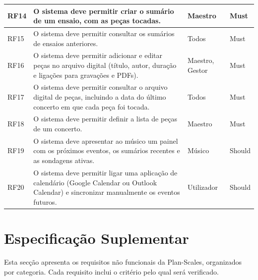 \begin{longtable}{|p{1.4cm}|p{8.6cm}|p{2.4cm}|p{1.6cm}|}
RF14 & O sistema deve permitir criar o sumário de um ensaio, com as peças tocadas. & Maestro & Must \\ \hline
RF15 & O sistema deve permitir consultar os sumários de ensaios anteriores. & Todos & Must \\ \hline
RF16 & O sistema deve permitir adicionar e editar peças no arquivo digital (título, autor, duração e ligações para gravações e PDFs). & Maestro, Gestor & Must \\ \hline
RF17 & O sistema deve permitir consultar o arquivo digital de peças, incluindo a data do último concerto em que cada peça foi tocada. & Todos & Must \\ \hline
RF18 & O sistema deve permitir definir a lista de peças de um concerto. & Maestro & Must \\ \hline
RF19 & O sistema deve apresentar ao músico um painel com os próximos eventos, os sumários recentes e as sondagens ativas. & Músico & Should \\ \hline
RF20 & O sistema deve permitir ligar uma aplicação de calendário (Google Calendar ou Outlook Calendar) e sincronizar manualmente os eventos futuros. & Utilizador & Should \\ \hline
\end{longtable}
\pagebreak

\section{Especificação Suplementar}
\label{sec:espec-suplementar}
Esta secção apresenta os requisitos não funcionais da Plan-Scales, organizados por categoria. Cada requisito inclui o critério pelo qual será verificado.

